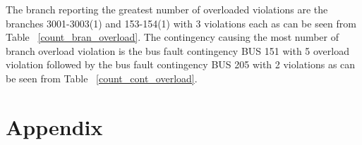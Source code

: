 \documentclass{report}
\begin{document}
The branch reporting the greatest number of overloaded violations are the branches 3001-3003(1) and 153-154(1) with 3 violations each as can be seen from Table ~\ref{count_bran_overload}. The contingency causing the most number of branch overload violation is the bus fault contingency BUS 151 with 5 overload violation followed by the bus fault contingency BUS 205 with 2 violations as can be seen from Table ~\ref{count_cont_overload}. 

\chapter*{Appendix}
\label{chapter:app}



\begin{table}[H]
\caption{Overload Count - Branch}
\label{count_bran_overload}
\centering
{}
\end{table}


\begin{table}[H]
\caption{Overload Count - Contingency}
\label{count_cont_overload}
\centering
{}
\end{table}
\end{document}
